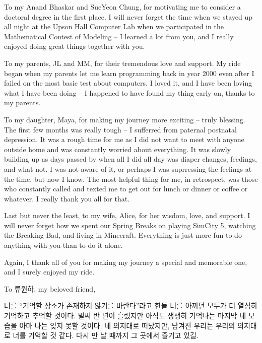 To my Anand Bhaskar and SueYeon Chung, for motivating me to consider a doctoral degree in the first place. I will never forget the time when we stayed up all night at the Upson Hall Computer Lab when we participated in the Mathematical Contest of Modeling -- I learned a lot from you, and I really enjoyed doing great things together with you. 

To my parents, JL and MM, for their tremendous love and support. My ride began when my parents let me learn programming back in year 2000 even after I failed on the most basic test about computers. I loved it, and I have been loving what I have been doing -- I happened to have found my thing early on, thanks to my parents. 

To my daughter, Maya, for making my journey more exciting -- truly blessing. The first few months was really tough -- I sufferred from paternal postnatal depression. It was a rough time for me as I did not want to meet with anyone outside home and was constantly worried about everything. It was slowly building up as days passed by when all I did all day was diaper changes, feedings, and what-not. I was not aware of it, or perhaps I was suprressing the feelings at the time, but now I know. The most helpful thing for me, in retrospect, was those who constantly called and texted me to get out for lunch or dinner or coffee or whatever. I really thank you all for that.

Last but never the least, to my wife, Alice, for her wisdom, love, and support. I will never forget how we spent our Spring Breaks on playing SimCity 5, watching the Breaking Bad, and living in Minecraft. Everything is just more fun to do anything with you than to do it alone. 

Again, I thank all of you for making my journey a special and memorable one, and I surely enjoyed my ride.


To 류원하, my beloved friend,

너를 ``기억할 장소가 존재하지 않기를 바란다''라고 한들
너를 아끼던 모두가 더 열심히 기억하고 추억할 것이다.
벌써 반 년이 흘렀지만 아직도 생생히 기억나는 마지막 네 모습을 아마 나는 잊지 못할 것이다.
네 의지대로 떠났지만, 남겨진 우리는 우리의 의지대로 너를 기억할 것 같다. 
다시 만 날 때까지 그 곳에서 즐기고 있길.

